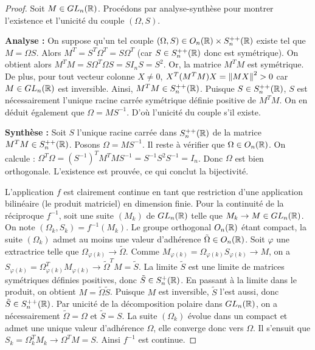 \lvspace \avspace {}
\begin{proof}

    Soit $M \in GL_n(\mathbb{R})$. Procédons par analyse-synthèse pour montrer l'existence et l'unicité du couple $(\Omega, S)$.

    \textbf{Analyse :} On suppose qu'un tel couple $(\Omega, S) \in O_n(\mathbb{R}) \times S_n^{++}(\mathbb{R})$ existe tel que $M = \Omega S$.
    Alors $M^T = S^T \Omega^T = S \Omega^T$ (car $S \in S_n^{++}(\mathbb{R})$ donc est symétrique).
    On obtient alors $M^T M = S \Omega^T \Omega S = S I_n S = S^2$.
    Or, la matrice $M^T M$ est symétrique. De plus, pour tout vecteur colonne $X \neq 0$, $X^T (M^T M) X = \left\|MX\right\|^2 > 0$ car $M \in GL_n(\mathbb{R})$ est inversible.
    Ainsi, $M^T M \in S_n^{++}(\mathbb{R})$. Puisque $S \in S_n^{++}(\mathbb{R})$, $S$ est nécessairement l'unique racine carrée symétrique définie positive de $M^T M$.
    On en déduit également que $\Omega = M S^{-1}$. D'où l'unicité du couple s'il existe.

    \textbf{Synthèse :} Soit $S$ l'unique racine carrée dans $S_n^{++}(\mathbb{R})$ de la matrice $M^T M \in S_n^{++}(\mathbb{R})$.
    Posons $\Omega = M S^{-1}$. Il reste à vérifier que $\Omega \in O_n(\mathbb{R})$.
    On calcule : $\Omega^T \Omega = (S^{-1})^T M^T M S^{-1} = S^{-1} S^2 S^{-1} = I_n$.
    Donc $\Omega$ est bien orthogonale. L'existence est prouvée, ce qui conclut la bijectivité.


    L'application $f$ est clairement continue en tant que restriction d'une application bilinéaire (le produit matriciel) en dimension finie.
    Pour la continuité de la réciproque $f^{-1}$, soit une suite $(M_k)$ de $GL_n(\mathbb{R})$ telle que $M_k \to M \in GL_n(\mathbb{R})$.
    On note $(\Omega_k, S_k) = f^{-1}(M_k)$.
    Le groupe orthogonal $O_n(\mathbb{R})$ étant compact, la suite $(\Omega_k)$ admet au moins une valeur d'adhérence $\tilde{\Omega} \in O_n(\mathbb{R})$.
    Soit $\varphi$ une extractrice telle que $\Omega_{\varphi(k)} \to \tilde{\Omega}$.
    Comme $M_{\varphi(k)} = \Omega_{\varphi(k)} S_{\varphi(k)} \to M$, on a $S_{\varphi(k)} = \Omega_{\varphi(k)}^T M_{\varphi(k)} \to \tilde{\Omega}^T M = \tilde{S}$.
    La limite $\tilde{S}$ est une limite de matrices symétriques définies positives, donc $\tilde{S} \in S_n^+(\mathbb{R})$.
    En passant à la limite dans le produit, on obtient $M = \tilde{\Omega} \tilde{S}$. Puisque $M$ est inversible, $\tilde{S}$ l'est aussi, donc $\tilde{S} \in S_n^{++}(\mathbb{R})$.
    Par unicité de la décomposition polaire dans $GL_n(\mathbb{R})$, on a nécessairement $\tilde{\Omega} = \Omega$ et $\tilde{S} = S$.
    La suite $(\Omega_k)$ évolue dans un compact et admet une unique valeur d'adhérence $\Omega$, elle converge donc vers $\Omega$.
    Il s'ensuit que $S_k = \Omega_k^T M_k \to \Omega^T M = S$. Ainsi $f^{-1}$ est continue.


\end{proof}
